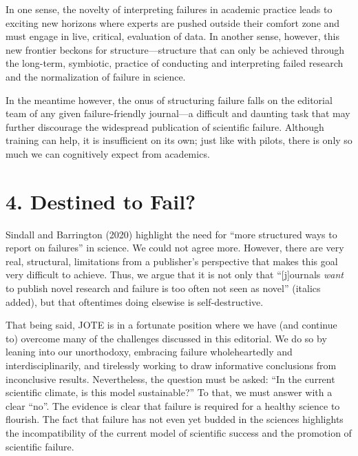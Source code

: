 \documentclass{article}
\begin{document}
In one sense, the novelty of interpreting failures in academic practice leads to exciting new horizons where experts are pushed outside their comfort zone and must engage in live, critical, evaluation of data. In another sense, however, this new frontier beckons for structure—structure that can only be achieved through the long-term, symbiotic, practice of conducting and interpreting failed research and the normalization of failure in science.

In the meantime however, the onus of structuring failure falls on the editorial team of any given failure-friendly journal—a difficult and daunting task that may further discourage the widespread publication of scientific failure. Although training can help, it is insufficient on its own; just like with pilots, there is only so much we can cognitively expect from academics. 

\section{}

\section{4\textbf{. }\textbf{Destined to Fail?}}

\textbf{}Sindall and Barrington (2020) highlight the need for “more structured ways to report on failures” in science. We could not agree more. However, there are very real, structural, limitations from a publisher's perspective that makes this goal very difficult to achieve. Thus, we argue that it is not only that “[j]ournals \emph{want} to publish novel research and failure is too often not seen as novel” (italics added), but that oftentimes doing elsewise is self-destructive. 

That being said, JOTE is in a fortunate position where we have (and continue to) overcome many of the challenges discussed in this editorial. We do so by leaning into our unorthodoxy, embracing failure wholeheartedly and interdisciplinarily, and tirelessly working to draw informative conclusions from inconclusive results. Nevertheless, the question must be asked: “In the current scientific climate, is this model sustainable?” To that, we must answer with a clear “no”. The evidence is clear that failure is required for a healthy science to flourish. The fact that failure has not even yet budded in the sciences highlights the incompatibility of the current model of scientific success and the promotion of scientific failure. 
\end{document}
